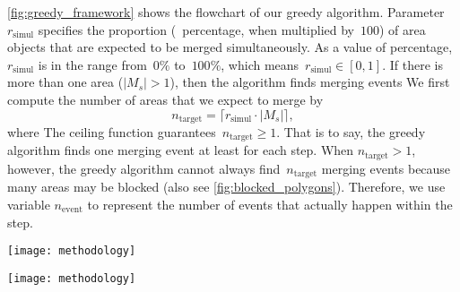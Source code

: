 \documentclass[twocolumn]{svjour3}          %
\begin{document}
\fig\ref{fig:greedy_framework} shows the flowchart of our greedy algorithm.
Parameter $r_\mathrm{simul}$ specifies 
the proportion (\ie~percentage, when multiplied by~$100$) of area objects that
are expected to be merged simultaneously.
As a value of percentage, 
$r_\mathrm{simul}$ is in the range from~$0\%$ to~$100\%$,
which means~$r_\mathrm{simul} \in [0,1]$.
If there is more than one area ($|M_s|>1$),
then the algorithm finds merging events 
We first compute the number of areas that we expect to merge by
\begin{equation}
\label{eq:n_target}
n_\mathrm{target} =
\lceil r_\mathrm{simul} \cdot |M_s| \rceil,
\end{equation}
where 
The ceiling function guarantees~$n_\mathrm{target}\ge 1$.
That is to say, the greedy algorithm 
finds one merging event at least for each step.
When $n_\mathrm{target} > 1$, however,
the greedy algorithm cannot always find~$n_\mathrm{target}$ merging events
because many areas may be blocked
(also see \fig\ref{fig:blocked_polygons}).
Therefore, we use variable $n_\mathrm{event}$
to represent the number of events that actually happen within the step. 


\begin{figure*}[tb]
\centering
\texttt{[image: methodology]}
\caption{The flowchart of our greedy algorithm.
}
\label{fig:greedy_framework}
\end{figure*}


\begin{figure*}[tb]
\centering
\texttt{[image: methodology]}
\caption{The process of finding simultaneous merging events for a single step.
    (a) From all the free areas,
	the least important one is selected to merge into
	its most compatible neighbor.
	Then,  the surrounding areas are blocked (marked by the crosses).
	(b) Next, the least important area from the remaining free areas
	is selected to merge with its most compatible neighbor,
	and the relevant areas are also blocked.
}
\label{fig:blocked_polygons}
\end{figure*}
\end{document}
